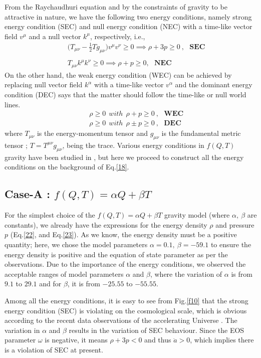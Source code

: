 \documentclass[aps,prd,showpacs,nofootinbib,floats,floatfix,preprintnumbers,groupedaddress,twocolumn]{revtex4-1}
\def \m{\mu}
\def \n{\nu}
\def \a{\alpha}
\def \b{\beta}
\def \ben{\begin{eqnarray}}
\def \een{\end{eqnarray}}
\def \o{\omega}
\def \r{\rho}
\def \non{\nonumber}
\begin{document}
    From the Raychaudhuri equation and by the constraints of gravity to be attractive in nature, we have the following two energy conditions, namely strong energy condition (SEC) and null energy condition (NEC) with a time-like vector field $v^\m$ and a null vector $k^\m$, respectively, i.e.,
\ben
    &&\big(T_{\m\n}-\frac{1}{2}T g_{\m\n}\big)v^\m v^\n\geq 0\implies \r+3p\geq 0~,~~~\textbf{SEC}\non\\
    \label{29}
\\
    && T_{\m\n}k^\m k^\n\geq 0\implies \r+p\geq 0,~~~\textbf{NEC}\label{30}
\een
    On the other hand, the weak energy condition (WEC) can be achieved by replacing null vector field $k^\a$ with a time-like vector $v^\a$ and the dominant energy condition (DEC) says that the matter should follow the time-like or null world lines.
\ben
    &&\r\geq 0~~with~~\r+p\geq 0~,~~~\textbf{WEC}\label{31}
\\
    &&\r\geq 0~~with~~\r\pm p\geq 0~,~~~\textbf{DEC}\label{32}
\een
    where $T_{\m\n}$ is the energy-momentum tensor and $g_{\m\n}$ is the fundamental metric tensor ; $T=T^{\m\n}g_{\m\n}$, being the trace. Various energy conditions in $f(Q,T)$ gravity have been studied in \cite{Simran1,Simran2}, but here we proceed to construct all the energy conditions on the background of Eq.\eqref{18}.



    
\subsection{Case-A : $f(Q,T)=\a Q+\b T$}
\noindent
    For the simplest choice of the $f(Q,T)=\a Q +\b T$ gravity model (where $\a,~\b$ are constants), we already have the expressions for the energy density $\r$ and pressure $p$ (Eq.\eqref{22}, and Eq.\eqref{23}). As we know, the energy density must be a positive quantity; here, we chose the model parameters $\a=0.1,~\b=-59.1$ to ensure the energy density is positive and the equation of state parameter as per the observations. Due to the importance of the energy conditions, we observed the acceptable ranges of model parameters $\a$ and $\b$, where the variation of $\a$ is from $9.1$ to $29.1$ and for $\b$, it is from $-25.55$ to $-55.55$.

    Among all the energy conditions, it is easy to see from Fig.\ref{f10} that the strong energy condition (SEC) is violating on the cosmological scale, which is obvious according to the recent data observations of the accelerating Universe \cite{Barcelo, Moraes1}. The variation in $\a$ and $\b$ results in the variation of SEC behaviour. Since the EOS parameter $\o$ is negative, it means $\r+3p<0$ and thus $\ddot{a}>0$, which implies there is a violation of SEC at present.
\end{document}
